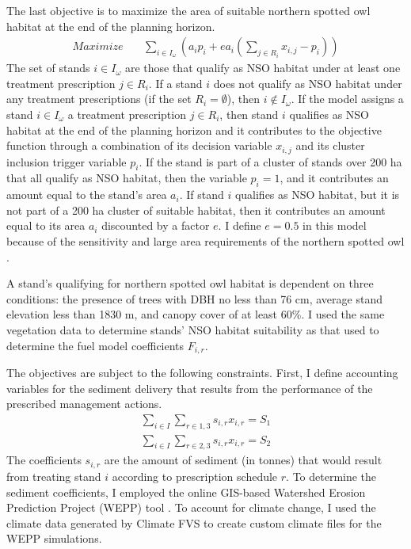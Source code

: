 The last objective is to maximize the area of suitable northern spotted owl habitat at the end of the planning horizon.
\begin{align}
Maximize \quad &\sum_{i\in I_\omega} \left(a_i p_i + e a_i \left( \sum_{j \in R_i} x_{i,j}-p_i \right) \right) \label{eqn:objOwl}
\end{align}
The set of stands $i \in I_\omega$ are those that qualify as NSO habitat under at least one treatment prescription $j \in R_i$. If a stand $i$ does not qualify as NSO habitat under any treatment prescriptions (if the set $R_i = \emptyset$), then $i \notin I_\omega$. If the model assigns a stand $i \in I_\omega$ a treatment prescription $j \in R_i$, then stand $i$ qualifies as NSO habitat at the end of the planning horizon and it contributes to the objective function through a combination of its decision variable $x_{i,j}$ and its cluster inclusion trigger variable $p_i$. If the stand is part of a cluster of stands over 200 ha that all qualify as NSO habitat, then the variable $p_i = 1$, and it contributes an amount equal to the stand's area $a_i$. If stand $i$ qualifies as NSO habitat, but it is not part of a 200 ha cluster of suitable habitat, then it contributes an amount equal to its area $a_i$ discounted by a factor $e$. I define $e = 0.5$ in this model because of the sensitivity and large area requirements of the northern spotted owl \cite{us2011revised}.

A stand's qualifying for northern spotted owl habitat is dependent on three conditions: the presence of trees with DBH no less than 76 cm, average stand elevation less than 1830 m, and canopy cover of at least 60\%. I used the same vegetation data to determine stands' NSO habitat suitability as that used to determine the fuel model coefficients $F_{i,r}$.

The objectives are subject to the following constraints. First, I define accounting variables for the sediment delivery that results from the performance of the prescribed management actions.
\begin{align}
\sum_{i\in I} \sum_{r\in 1,3} s_{i,r} x_{i,r} = S_1 \label{eqn:constraintSediment1}\\
\sum_{i\in I} \sum_{r\in 2,3} s_{i,r} x_{i,r} = S_2 \label{eqn:constraintSediment2}
\end{align}
The coefficients $s_{i,r}$ are the amount of sediment (in tonnes) that would result from treating stand $i$ according to prescription schedule $r$. To determine the sediment coefficients, I employed the online GIS-based Watershed Erosion Prediction Project (WEPP) tool \cite{frankenberger2011development}. To account for climate change, I used the climate data generated by Climate FVS to create custom climate files for the WEPP simulations.

